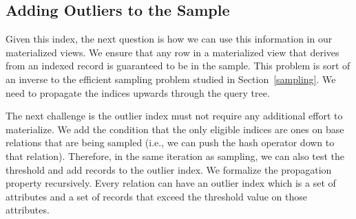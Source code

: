 \subsection{Adding Outliers to the Sample}
Given this index, the next question is how we can use this information in our materialized views.
We ensure that any row in a materialized view that derives from an indexed record is guaranteed to be in the sample.
This problem is sort of an inverse to the efficient sampling problem studied in Section~\ref{sampling}.
We need to propagate the indices upwards through the query tree.

The next challenge is the outlier index must not require any additional effort to materialize.
We add the condition that the only eligible indices are ones on base relations that are being sampled (i.e., we can push the hash operator down to that relation).
Therefore, in the same iteration as sampling, we can also test the threshold and add records to the outlier index. 
We formalize the propagation property recursively. 
Every relation can have an outlier index which is a set of attributes and a set of records that exceed the threshold value on those attributes.

